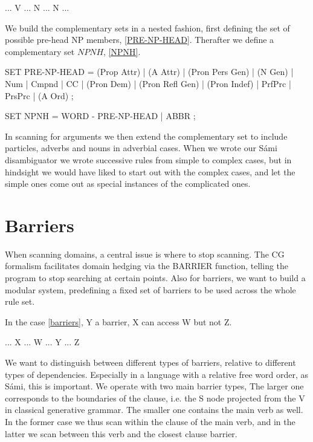 \documentclass[a4paper,english]{article}
\begin{document}
\begin{example}\label{islands}
... V ... N ... N ...
\end{example}

We build the complementary sets in a nested fashion, first defining the set of possible pre-head NP members, \ref{PRE-NP-HEAD}. Therafter we define a complementary set $NPNH$, \ref{NPNH}.


\begin{example}\label{PRE-NP-HEAD}
SET PRE-NP-HEAD = (Prop Attr) | (A Attr) | (Pron Pers Gen) | (N Gen) | Num | Cmpnd | CC | (Pron Dem) | (Pron Refl Gen) | (Pron Indef) | PrfPrc | PrsPrc | (A Ord) ; \\
\end{example}
\begin{example}\label{NPNH}
SET NPNH = WORD - PRE-NP-HEAD | ABBR ; \\                 
\end{example}

In scanning for arguments we then extend the complementary set to include particles, adverbs and nouns in adverbial cases. When we wrote our Sámi disambiguator we wrote successive rules from simple to complex cases, but in hindsight we would have liked to start out with the complex cases, and let the simple ones come out as special instances of the complicated ones.



\section{Barriers}

When scanning domains, a central issue is where to stop scanning. The CG formalism facilitates domain hedging via the BARRIER function, telling the program to stop searching at certain points. Also for barriers, we want to build a modular system, predefining a fixed set of barriers to be used across the whole rule set. 

In the case \ref{barriers}, Y a barrier, X can access W but not Z. 

\begin{example}\label{barriers}
... X ... W ... Y ... Z 
\end{example}

We want to distinguish between different types of barriers, relative to different types of dependencies. Especially in a language with a relative free word order, as Sámi, this is important. We operate with two main barrier types, The larger one corresponds to the boundaries of the clause, i.e. the S node projected from the V in classical generative grammar. The smaller one contains the main verb as well. In the former case we thus scan within the clause of the main verb, and in the latter we scan between this verb and the closest clause barrier.
\end{document}
